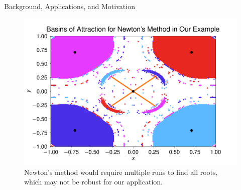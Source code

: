 \documentclass[final]{beamer}
\begin{document}
\begin{frame}{}
\begin{columns}[t]
\begin{column}{.31\linewidth}
\begin{block}{Background, Applications, and Motivation}
\begin{figure}[H]
\begin{center}
\begin{minipage}{.55\textwidth}
\end{minipage}%
\begin{minipage}{.45\textwidth}
\includegraphics[width=\textwidth]{newton_basins.pdf}
\end{minipage}%
\end{center}
\caption{Newton's method would require multiple runs to find all roots, which may not be robust for our application.}
\end{figure}
\end{block}


\end{column}
\end{columns}
\end{frame}
\end{document}
